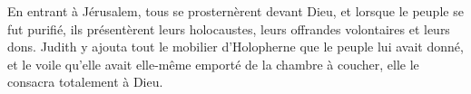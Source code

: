 En entrant à Jérusalem, tous se prosternèrent devant Dieu,
	et lorsque le peuple se fut purifié, ils présentèrent leurs holocaustes,
	leurs offrandes volontaires et leurs dons.
Judith y ajouta tout le mobilier d’Holopherne que le peuple lui avait donné,
	et le voile qu’elle avait elle-même emporté de la chambre à coucher,
	elle le consacra totalement à Dieu.
